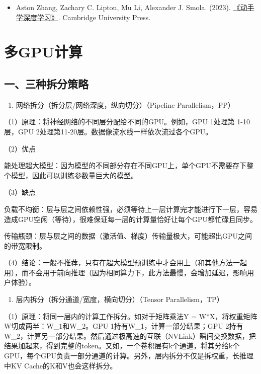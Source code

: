 \begin{itemize}
\tightlist
\item
  Aston Zhang, Zachary C. Lipton, Mu Li, Alexander J. Smola. (2023). \href{https://zh.d2l.ai/}{《动手学深度学习》}. Cambridge University Press.
\end{itemize}

\clearpage

\hypertarget{ux591agpuux8ba1ux7b97}{%
\section{多GPU计算}\label{ux591agpuux8ba1ux7b97}}

\hypertarget{ux4e00ux4e09ux79cdux62c6ux5206ux7b56ux7565}{%
\subsection{一、三种拆分策略}\label{ux4e00ux4e09ux79cdux62c6ux5206ux7b56ux7565}}

\begin{enumerate}
\def\labelenumi{\arabic{enumi}.}
\tightlist
\item
  网络拆分（拆分层/网络深度，纵向切分）（Pipeline Parallelism，PP）
\end{enumerate}

（1）原理：将神经网络的不同层分配给不同的GPU。例如，GPU 1处理第 1-10 层，GPU 2处理第11-20层。数据像流水线一样依次流过各个GPU。

（2）优点

能处理超大模型：因为模型的不同部分存在不同GPU上，单个GPU不需要存下整个模型，因此可以训练参数量巨大的模型。

（3）缺点

负载不均衡：层与层之间依赖性强，必须等待上一层计算完才能进行下一层，容易造成GPU空闲（等待），很难保证每一层的计算量恰好让每个GPU都忙碌且同步。

传输瓶颈：层与层之间的数据（激活值、梯度）传输量极大，可能超出GPU之间的带宽限制。

（4）结论：一般不推荐，只有在超大模型预训练中才会用上（和其他方法一起用），而不会用于前向推理（因为相同算力下，此方法最慢，会增加延迟，影响用户体验）。

\begin{enumerate}
\def\labelenumi{\arabic{enumi}.}
\setcounter{enumi}{1}
\tightlist
\item
  层内拆分（拆分通道/宽度，横向切分）（Tensor Parallelism，TP）
\end{enumerate}

（1）原理：将同一层内的计算工作拆分。如对于矩阵乘法Y = W*X，将权重矩阵W切成两半：W\_1和W\_2。GPU 1持有W\_1，计算一部分结果；GPU 2持有W\_2，计算另一部分结果。然后通过极高速的互联（NVLink）瞬间交换数据，把结果加起来，得到完整的token。又如，一个卷积层有k个通道，将其分给k个GPU，每个GPU负责一部分通道的计算。另外，层内拆分不仅是拆权重，长推理中KV Cache的K和V也会这样拆分。

